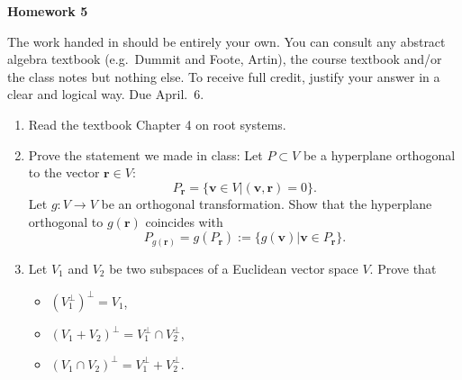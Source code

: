 \documentclass[12pt]{article}
\title{}
\date{}
\theoremstyle{plain}
\theoremstyle{definition}
\theoremstyle{remark}
\newcommand{\lra}{\longrightarrow}
\begin{document}
\begin{center}
{\Large \bf Homework 5}
\end{center}
The work handed in should be entirely your own. You can consult any abstract algebra textbook (e.g.~Dummit and Foote, Artin), the course textbook and/or the class notes but nothing else. To receive full credit, justify your answer in a clear and logical way. Due April.~6.

\begin{enumerate}
\item Read the textbook Chapter 4 on root systems.

\item Prove the statement we made in class: Let $P\subset V$ be a hyperplane orthogonal to the vector $\mathbf{r}\in V$:
\[
P_\mathbf{r}=\{\mathbf{v}\in V|(\mathbf{v},\mathbf{r})=0\}.
\] 
Let $g:V\lra V$ be an orthogonal transformation. Show that the hyperplane orthogonal to $g(\mathbf{r})$ coincides with
\[
P_{g(\mathbf{r})}=g(P_\mathbf{r}):=\{g(\mathbf{v})|\mathbf{v}\in P_\mathbf{r}\}.
\]

\item Let $V_1$ and $V_2$ be two subspaces of a Euclidean vector space $V$. Prove that
\begin{itemize}
\item $(V_1^{\perp})^\perp=V_1$,
\item $ (V_1+V_2)^{\perp}=V_1^\perp \cap V_2^\perp$,
\item $(V_1\cap V_2)^\perp = V_1^\perp+V_2^\perp$.
\end{itemize}


\end{enumerate}
\end{document}
